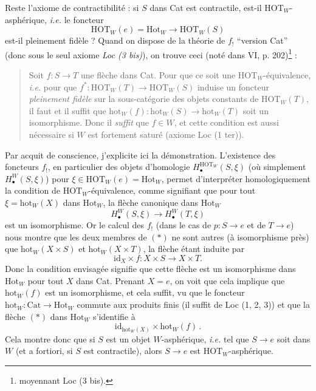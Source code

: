 \documentclass[11pt]{article}
\newcommand{\printedpage}[1]{\marginpar{\footnotesize p.~#1}}
\newcommand{\msp}[1]{\marginpar{\footnotesize [#1]}}
\begin{document}
\msp{page 111}
Reste l'axiome de contractibilité : si $S$ dans Cat est contractile, est-il $\mathrm{HOT}_W$-asphérique, \textit{i.e.} le foncteur
\[
\mathrm{HOT}_W(e) = \mathrm{Hot}_W \longrightarrow \mathrm{HOT}_W(S)
\]
\printedpage{53}
est-il pleinement fidèle ? Quand on dispose de la théorie de $f_!$ “version Cat” (donc sous le seul axiome \textit{Loc (3 bis)}), on trouve ceci (noté dans VI, p. 202)\footnote[52]{moyennant Loc (3 bis).} :
\begin{quote}
Soit $f : S \longrightarrow T$ une flèche dans Cat. Pour que ce soit une $\mathrm{HOT}_W$-équivalence, \textit{i.e.} pour que $f^* : \mathrm{HOT}_W(T) \longrightarrow \mathrm{HOT}_W(S)$ induise un foncteur \textit{pleinement fidèle} sur la sous-catégorie des objets constants de $\mathrm{HOT}_W(T)$, il faut et il suffit que $\mathrm{hot}_W(f) : \mathrm{hot}_W(S) \longrightarrow \mathrm{hot}_W(T)$ soit un isomorphisme. Donc il \textit{suffit} que $f \in W$, et cette condition est aussi nécessaire si $W$ est fortement saturé (axiome Loc (1 ter)).
\end{quote}
Par acquit de conscience, j'explicite ici la démonstration. L'existence des foncteurs
\msp{page 112}
$f_!$, en particulier des objets d'homologie $H_\bullet^{\mathrm{HOT}_W}(S,\xi)$ (où simplement $H_\bullet^W(S,\xi)$) pour $\xi \in \mathrm{HOT}_W(e) = \mathrm{Hot}_W$, permet d'interpréter homologiquement la condition de $\mathrm{HOT}_W$-équivalence, comme signifiant que pour tout $\xi = \mathrm{hot}_W(X)$ dans $\mathrm{Hot}_W$, la flèche canonique dans $\mathrm{Hot}_W$ %
\[
H_\bullet^W(S,\xi) \longrightarrow H_\bullet^W(T,\xi) \tag*{$(*)$}
\]
est un isomorphisme. Or le calcul des $f_!$ (dans le cas de $p : S \longrightarrow e$ et de $T \longrightarrow e$) nous montre que les deux membres de $(*)$ ne sont autres (à isomorphisme près) que $\mathrm{hot}_W(X \times S)$ et $\mathrm{hot}_W(X \times T)$, la flèche étant induite par
\[
\mathrm{id}_X \times f : X \times S \longrightarrow X \times T. \tag*{$(*)$}
\]
Donc la condition envisagée signifie que cette flèche est un isomorphisme dans $\mathrm{Hot}_W$ pour tout $X$ dans Cat. Prenant $X = e$, on voit que cela implique que $\mathrm{hot}_W(f)$ est un isomorphisme, et cela suffit, vu que le
\msp{page 113}
foncteur $\mathrm{hot}_W : \mathrm{Cat} \longrightarrow \mathrm{Hot}_W$ commute aux produits finis (il suffit de Loc (1, 2, 3)) et que la flèche $(*)$ dans $\mathrm{Hot}_W$ s'identifie à
\[
\mathrm{id}_{\mathrm{hot}_W(X)} \times \mathrm{hot}_W(f)\,.
\]
Cela montre donc que si $S$ est un objet $W$-asphérique, \textit{i.e.} tel que $S \longrightarrow e$ soit dans $W$ (et a fortiori, si $S$ est contractile), alors $S \longrightarrow e$ est $\mathrm{HOT}_W$-asphérique.
\end{document}
